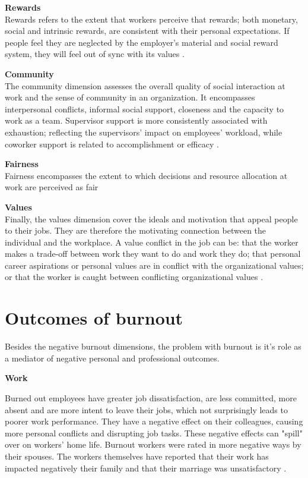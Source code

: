 \textbf{Rewards}\\
Rewards refers to the extent that workers perceive that rewards; both monetary, social and intrinsic rewards, are consistent with their personal expectations. If people feel they are neglected by the employer's material and social reward system, they will feel out of sync with its values \parencites{brom_areas_2015}.

\textbf{Community}\\
The community dimension assesses the overall quality of social interaction at work and the sense of community in an organization. It encompasses interpersonal conflicts, informal social support, closeness and the capacity to work as a team. Supervisor support is more consistently associated with exhaustion; reflecting the supervisors' impact on employees' workload, while coworker support is related to accomplishment or efficacy \parencites{brom_areas_2015}[46]{maslach_understanding_2017}.

\textbf{Fairness}\\
Fairness encompasses the extent to which decisions and resource allocation at work are perceived as fair \parencite{brom_areas_2015}

\textbf{Values}\\
Finally, the values dimension cover the ideals and motivation that appeal people to their jobs. They are therefore the motivating connection between the individual and the workplace. A value conflict in the job can be: that the worker makes a trade-off between work they want to do and work they do; that personal career aspirations or personal values are in conflict with the organizational values; or that the worker is caught between conflicting organizational values \parencites{brom_areas_2015}[47]{maslach_understanding_2017}.

\section{Outcomes of burnout}

Besides the negative burnout dimensions, the problem with burnout is it's role as a mediator of negative personal and professional outcomes.

\textbf{Work}

Burned out employees have greater job dissatisfaction, are less committed, more absent and are more intent to leave their jobs, which not surprisingly leads to poorer work performance. They have a negative effect on their colleagues, causing more personal conflicts and disrupting job tasks. These negative effects can "spill" over on workers' home life. Burnout workers were rated in more negative ways by their spouses. The workers themselves have reported that their work has impacted negatively their family and that their marriage was unsatisfactory \parencite[49]{maslach_understanding_2017}. 

